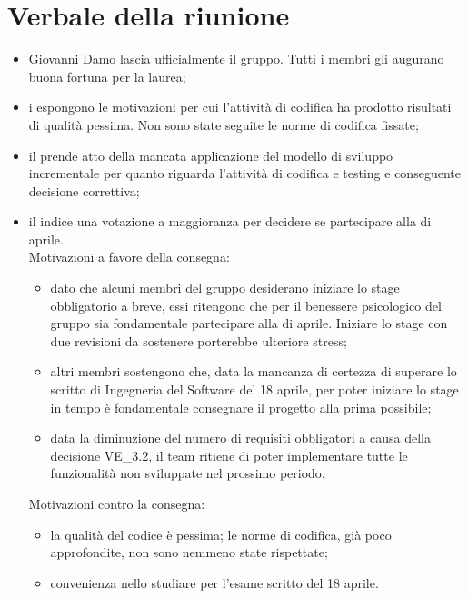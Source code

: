 \documentclass[a4paper,11pt]{article}
\begin{document}
	\section{Verbale della riunione}
		\begin{itemize}
			\item Giovanni Damo lascia ufficialmente il gruppo. Tutti i membri gli augurano buona fortuna per la laurea;
			\item i \programmatori{} espongono le motivazioni per cui l'attività di codifica ha prodotto risultati di qualità pessima. Non sono state seguite le norme di codifica fissate;
			\item il \responsabile{} prende atto della mancata applicazione del modello di sviluppo incrementale per quanto riguarda l'attività di codifica e testing e conseguente decisione correttiva;
			\item il \responsabile{} indice una votazione a maggioranza per decidere se partecipare alla \revaqual{} di aprile. \\
			Motivazioni a favore della consegna:
			\begin{itemize}
				\item dato che alcuni membri del gruppo desiderano iniziare lo stage obbligatorio a breve, essi ritengono che per il benessere psicologico del gruppo sia fondamentale partecipare alla \revaqual{} di aprile. Iniziare lo stage con due revisioni da sostenere porterebbe ulteriore stress;
				\item altri membri sostengono che, data la mancanza di certezza di superare lo scritto di Ingegneria del Software del 18 aprile, per poter iniziare lo stage in tempo è fondamentale consegnare il progetto alla prima \revacc{} possibile;
				\item data la diminuzione del numero di requisiti obbligatori a causa della decisione VE\_3.2, il team ritiene di poter implementare tutte le funzionalità non sviluppate nel prossimo periodo.
			\end{itemize}
			Motivazioni contro la consegna:
			\begin{itemize}
				\item la qualità del codice è pessima; le norme di codifica, già poco approfondite, non sono nemmeno state rispettate;
				\item convenienza nello studiare per l'esame scritto del 18 aprile.
			\end{itemize}
		\end{itemize}
\end{document}
